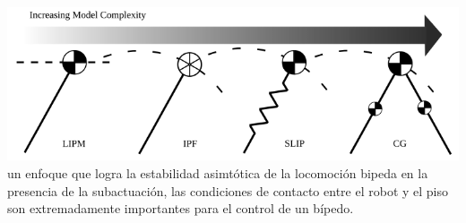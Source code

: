 \documentclass[10pt,onecolumn,twoside,letterpaper]{article}
\begin{document}
\includegraphics[scale=0.4]{../../images/SimpleBipedModels.png}\cite{Grizzle2014}\\
un enfoque que logra la estabilidad asimt\'otica de la locomoci\'on bipeda en la presencia de la subactuaci\'on, las condiciones de contacto entre el robot y el piso son extremadamente importantes para el control de un b\'ipedo\cite{Grizzle2014}.\\
\end{document}
